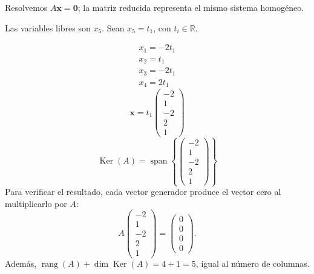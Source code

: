 \documentclass[12pt]{article}
\newcommand{\rang}{\operatorname{rang}}
\newcommand{\Ker}{\operatorname{Ker}}
\newcommand{\vect}[1]{\boldsymbol{#1}}
\begin{document}
Resolvemos $A\vect x=\vect0$; la matriz reducida representa el mismo sistema homogéneo.

Las variables libres son $x_{5}$. Sean $x_{5}=t_{1}$, con $t_i\in\mathbb R$.

\[
\begin{aligned}x_{1}=- 2 t_{1}\\x_{2}=t_{1}\\x_{3}=- 2 t_{1}\\x_{4}=2 t_{1}\end{aligned}
\]
\[
\vect x=t_{1}\begin{pmatrix}-2\\1\\-2\\2\\1\end{pmatrix}
\]
\[
\boxed{\Ker(A)=\operatorname{span}\left\{\begin{pmatrix}-2\\1\\-2\\2\\1\end{pmatrix}\right\}}
\]
Para verificar el resultado, cada vector generador produce el vector cero al multiplicarlo por $A$:
\[
A\begin{pmatrix}-2\\1\\-2\\2\\1\end{pmatrix}=\begin{pmatrix}0\\0\\0\\0\end{pmatrix}.
\]
Además, $\rang(A)+\dim\Ker(A)=4+1=5$, igual al número de columnas.


\medskip
\end{document}
